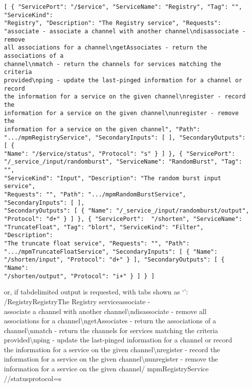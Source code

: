 \begin{verbatim}
[ { "ServicePort": "/$ervice", "ServiceName": "Registry", "Tag": "", "ServiceKind":
"Registry", "Description": "The Registry service", "Requests":
"associate - associate a channel with another channel\ndisassociate - remove
all associations for a channel\ngetAssociates - return the associations of a
channel\nmatch - return the channels for services matching the criteria
provided\nping - update the last-pinged information for a channel or record
the information for a service on the given channel\nregister - record the
information for a service on the given channel\nunregister - remove the
information for a service on the given channel", "Path":
".../mpmRegistryService", "SecondaryInputs": [ ], "SecondaryOutputs": [ {
"Name": "/$ervice/status", "Protocol": "s" } ] }, { "ServicePort":
"/_service_/input/randomburst", "ServiceName": "RandomBurst", "Tag": "",
"ServiceKind": "Input", "Description": "The random burst input service",
"Requests": "", "Path": ".../mpmRandomBurstService", "SecondaryInputs": [ ],
"SecondaryOutputs": [ { "Name": "/_service_/input/randomburst/output",
"Protocol": "d+" } ] }, { "ServicePort":  "/shorten", "ServiceName":
"TruncateFloat", "Tag": "blort", "ServiceKind": "Filter", "Description":
"The truncate float service", "Requests": "", "Path":
".../mpmTruncateFloatService", "SecondaryInputs": [ { "Name":
"/shorten/input", "Protocol": "d+" } ], "SecondaryOutputs": [ { "Name":
"/shorten/output", "Protocol": "i+" } ] } ]
\end{verbatim}
\outputEnd{}
or, if tab\longDash{}delimited output is requested, with tabs shown as `\tabSymbol':
\outputBegin{}
/\dollarService\pseudotab{}Registry\pseudotab{}Registry\pseudotab\pseudotab{}The Registry
service\pseudotab{}associate - \\
associate a channel with another channel\textbackslash{}ndisassociate - remove all\\
associations for a channel\textbackslash{}ngetAssociates - return the associations of a\\
channel\textbackslash{}nmatch - return the channels for services matching the criteria\\
provided\textbackslash{}nping - update the last-pinged information for a channel or
record\\
the information for a service on the given channel\textbackslash{}nregister - record the\\
information for a service on the given channel\textbackslash{}nunregister - remove the\\
information for a service on the given channel\pseudotab\textellipsis/%
mpmRegistryService\pseudotwotabs\\
/\dollarService/status\textbraceleft{}protocol=s\textbraceright\\

